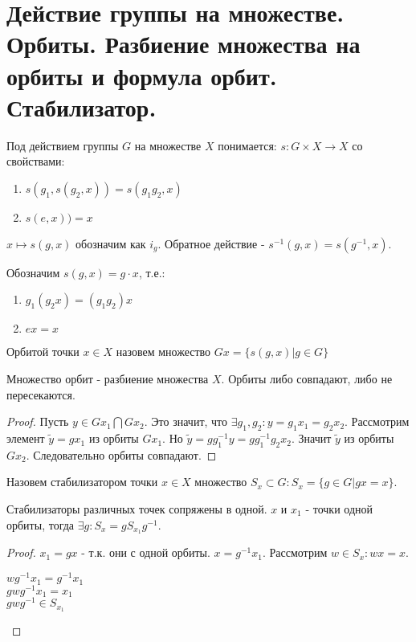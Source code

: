 \section{Действие группы на множестве. Орбиты. Разбиение множества на орбиты и формула орбит. Стабилизатор.}

\begin{defn}
Под действием группы $G$ на множестве $X$ понимается: $s: G \times X \rightarrow X$ со свойствами:
\begin{enumerate}
  \item $s(g_1, s(g_2, x)) = s(g_1 g_2, x)$
  \item $s(e, x)) = x$
\end{enumerate}
\end{defn}

\vspace{0.5cm}
$x \mapsto s(g, x)$ обозначим как $i_g$. Обратное действие - $s^{-1}(g, x) = s(g^{-1}, x)$. \\
\par Обозначим $s(g, x) = g \cdot x$, т.е.:
\begin{enumerate}
 \item $g_1(g_2x) = (g_1g_2)x$
 \item $ex = x$
\end{enumerate}

\begin{defn}
Орбитой точки $x \in X$ назовем множество $Gx = \{ s(g, x) | g \in G \}$
\end{defn}

\begin{lem}
Множество орбит - разбиение множества $X$. Орбиты либо совпадают, либо не пересекаются.
\end{lem}
\begin{proof}
Пусть $y \in G{x_1} \bigcap G{x_2}$. Это значит, что $ \exists g_1, g_2: y = g_1x_1 = g_2x_2$.
Рассмотрим элемент $\widetilde{y} = gx_1$ из орбиты $G{x_1}$. Но $\widetilde{y} = gg^{-1}_1y = gg^{-1}_1g_2x_2$. 
Значит $\widetilde{y}$ из орбиты $G{x_2}$. Следовательно орбиты совпадают.
\end{proof}

\begin{defn}
Назовем стабилизатором точки $x \in X$ множество $S_x \subset G: S_x = \{g \in G | gx = x \}$.
\end{defn}

\begin{lem}
Стабилизаторы различных точек сопряжены в одной. $x$ и $x_1$ - точки одной орбиты,
тогда $\exists g: S_x = gS_{x_1}g^{-1}$.
\end{lem}
\begin{proof}
$x_1 = gx$ - т.к. они с одной орбиты. $x = g^{-1}x_1$. Рассмотрим $w \in S_x: wx = x$. 
\begin{center}
$wg^{-1}x_1 = g^{-1}x_1$\\
$gwg^{-1}x_1 = x_1$\\
$gwg^{-1} \in S_{x_1}$
\end{center}
\end{proof}

